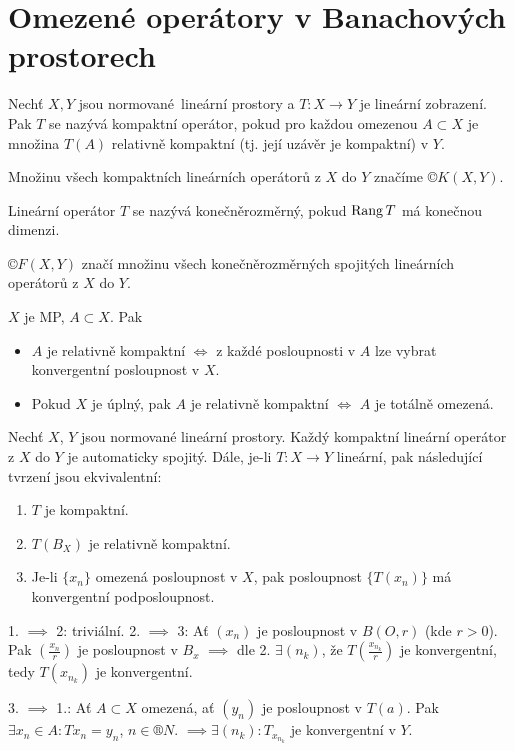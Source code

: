 \documentclass[12pt]{article}					%
\begin{document}
\section{Omezené operátory v Banachových prostorech}
\begin{definice}
	Nechť $X, Y$ jsou normované lineární prostory a $T: X \rightarrow Y$ je lineární zobrazení. Pak $T$ se nazývá kompaktní operátor, pokud pro každou omezenou $A \subset X$ je množina $T(A)$ relativně kompaktní (tj. její uzávěr je kompaktní) v $Y$.

	Množinu všech kompaktních lineárních operátorů z $X$ do $Y$ značíme $©K(X, Y)$.

	Lineární operátor $T$ se nazývá konečněrozměrný, pokud $\operatorname{Rang} T$ má konečnou dimenzi.

	$©F(X, Y)$ značí množinu všech konečněrozměrných spojitých lineárních operátorů z $X$ do $Y$.
\end{definice}

\begin{poznamka}
	$X$ je MP, $A \subset X$. Pak

	\begin{itemize}
		\item $A$ je relativně kompaktní $\Leftrightarrow$ z každé posloupnosti v $A$ lze vybrat konvergentní posloupnost v $X$.
		\item Pokud $X$ je úplný, pak $A$ je relativně kompaktní $\Leftrightarrow$ $A$ je totálně omezená.
	\end{itemize}
\end{poznamka}

\begin{tvrzeni}
	Nechť $X$, $Y$ jsou normované lineární prostory. Každý kompaktní lineární operátor z $X$ do $Y$ je automaticky spojitý. Dále, je-li $T: X \rightarrow Y$ lineární, pak následující tvrzení jsou ekvivalentní:

	\begin{enumerate}
		\item $T$ je kompaktní.
		\item $T(B_X)$ je relativně kompaktní.
		\item Je-li $\{x_n\}$ omezená posloupnost v $X$, pak posloupnost $\{T(x_n)\}$ má konvergentní podposloupnost.
	\end{enumerate}

	\begin{dukazin}
		1. $\implies$ 2: triviální. 2. $\implies$ 3: Ať $(x_n)$ je posloupnost v $B(O, r)$ (kde $r > 0$). Pak $(\frac{x_n}{r})$ je posloupnost v $B_x$ $\implies$ dle 2. $\exists (n_k)$, že $T(\frac{x_{n_k}}{r})$ je konvergentní, tedy $T(x_{n_k})$ je konvergentní.

		3. $\implies$ 1.: Ať $A \subset X$ omezená, ať $(y_n)$ je posloupnost v $T(a)$. Pak $\exists x_n \in A: T x_n = y_n$, $n \in ®N$. $\implies \exists (n_k): T_{x_{n_k}}$ je konvergentní v $Y$.
	\end{dukazin}
\end{tvrzeni}
\end{document}
